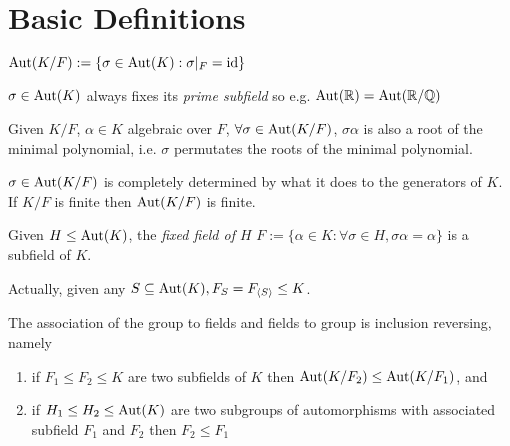 \documentclass[a4paper]{article}
\begin{document}
\maketitle

\tableofcontents

\section{Basic Definitions}

\begin{definition}
    $\operatorname{Aut}(K/F) := \{\sigma \in \operatorname{Aut}(K): \sigma|_F = \operatorname{id} \}$
\end{definition}

$\sigma \in \operatorname{Aut}(K)$ always fixes its \emph{prime subfield} so e.g. $\aut(\mathbb{R}) = \aut(\mathbb{R}/\mathbb{Q})$

\begin{proposition}
  \label{prop:permutation}
    Given $K/F$, $\alpha \in K$ algebraic over $F$, $\forall\sigma \in \operatorname{Aut}(K/F)$, $\sigma\alpha$ is also a root of the minimal polynomial, i.e. $\sigma$ permutates the roots of the minimal polynomial.
\end{proposition}

$\sigma \in \operatorname{Aut}(K/F)$ is completely determined by what it does to the generators of $K$. If $K/F$ is finite then $\operatorname{Aut}(K/F)$ is finite.

\begin{proposition}
    Given $H \leq \operatorname{Aut}(K)$, the \emph{fixed field of $H$} $F := \{\alpha \in K:\forall\sigma \in H, \sigma\alpha = \alpha\}$ is a subfield of $K$.
\end{proposition}

Actually, given any $S \subseteq \operatorname{Aut}(K), F_S = F_{\langle S \rangle} \leq K$.

\begin{proposition}
    The association of the group to fields and fields to group is inclusion reversing, namely

    \begin{enumerate}
        \item if $F_1 \leq F_2 \leq K$ are two subfields of $K$ then $\operatorname{Aut}(K/F_2) \leq \operatorname{Aut}(K/F_1)$, and
        \item if $H_1 \leq H_2 \leq \operatorname{Aut}(K)$ are two subgroups of automorphisms with associated subfield $F_1$ and $F_2$ then $F_2 \leq F_1$
    \end{enumerate}

\end{proposition}
\end{document}
